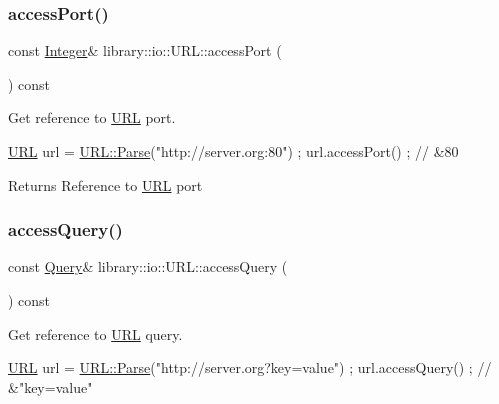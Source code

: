 \subsubsection{\texorpdfstring{access\+Port()}{accessPort()}}
{\footnotesize\ttfamily const \hyperlink{namespacelibrary_1_1io_a0a929bf9e177597c2e92073d200dda53}{Integer}\& library\+::io\+::\+U\+R\+L\+::access\+Port (\begin{DoxyParamCaption}{ }\end{DoxyParamCaption}) const}



Get reference to \hyperlink{classlibrary_1_1io_1_1_u_r_l}{U\+RL} port. 


\begin{DoxyCode}
\hyperlink{classlibrary_1_1io_1_1_u_r_l_a7e9c070138a6dbd000ffb10b7cd8a5c4}{URL} url = \hyperlink{classlibrary_1_1io_1_1_u_r_l_a98cf42141cf75e1dd5362eb208a1e2bd}{URL::Parse}(\textcolor{stringliteral}{"http://server.org:80"}) ;
url.accessPort() ; \textcolor{comment}{// &80}
\end{DoxyCode}


\begin{DoxyReturn}{Returns}
Reference to \hyperlink{classlibrary_1_1io_1_1_u_r_l}{U\+RL} port 
\end{DoxyReturn}
\mbox{\label{classlibrary_1_1io_1_1_u_r_l_a8eb98ee64442ec3e0ab9fc28881b8e84}} 
\subsubsection{\texorpdfstring{access\+Query()}{accessQuery()}}
{\footnotesize\ttfamily const \hyperlink{namespacelibrary_1_1io_a39ebaf2265de78ba79eb5347f2af61b3}{Query}\& library\+::io\+::\+U\+R\+L\+::access\+Query (\begin{DoxyParamCaption}{ }\end{DoxyParamCaption}) const}



Get reference to \hyperlink{classlibrary_1_1io_1_1_u_r_l}{U\+RL} query. 


\begin{DoxyCode}
\hyperlink{classlibrary_1_1io_1_1_u_r_l_a7e9c070138a6dbd000ffb10b7cd8a5c4}{URL} url = \hyperlink{classlibrary_1_1io_1_1_u_r_l_a98cf42141cf75e1dd5362eb208a1e2bd}{URL::Parse}(\textcolor{stringliteral}{"http://server.org?key=value"}) ;
url.accessQuery() ; \textcolor{comment}{// &"key=value"}
\end{DoxyCode}


